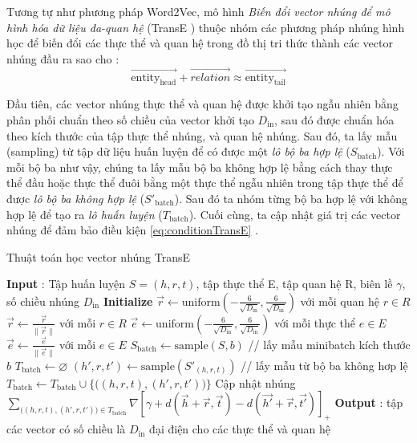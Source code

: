 Tương tự như phương pháp Word2Vec\cite{mikolov2013efficient}, mô hình \textit{Biến đổi vector nhúng để mô hình hóa dữ liệu đa-quan hệ} (TransE \cite{bordes2013translating}) thuộc nhóm các phương pháp nhúng hình học để biến đổi các thực thể và quan hệ trong đồ thị tri thức thành các vector nhúng đầu ra sao cho :
\begin{equation}
	\label{eq:conditionTransE}
	\overrightarrow{\text{entity}_{\text{head}}} + \overrightarrow{relation} \approx \overrightarrow{\text{entity}_{\text{tail}}}
\end{equation}

Đầu tiên, các vector nhúng thực thể và quan hệ được khởi tạo ngẫu nhiên bằng phân phối chuẩn theo số chiều của vector khởi tạo $D_{\text{in}}$, sau đó được chuẩn hóa theo kích thước của tập thực thể nhúng, và quan hệ nhúng.
Sau đó, ta lấy mẫu (sampling) từ tập dữ liệu huấn luyện để có được một \textit{lô bộ ba hợp lệ} ($S_{\text{batch}}$). Với mỗi bộ ba như vậy, chúng ta lấy mẫu bộ ba không hợp lệ bằng cách thay thực thể đầu hoặc thực thể đuôi bằng một thực thể ngẫu nhiên trong tập thực thể để được \textit{lô bộ ba không hợp lệ} ($S'_{\text{batch}}$). Sau đó ta nhóm từng bộ ba hợp lệ với không hợp lệ để tạo ra \textit{lô huấn luyện} ($T_{\text{batch}}$). Cuối cùng, ta cập nhật giá trị các vector nhúng để đảm bảo điều kiện  \ref{eq:conditionTransE} .

\begin{algorithm}
	\caption{Thuật toán học vector nhúng TransE \protect\cite{bordes2013translating}}\label{alg:TransE}
	\begin{algorithmic}[1]
		\Statex \textbf{Input} :
		Tập huấn luyện $S = {(h, r, t)}$, tập thực thể E, tập quan hệ R, biên lề $\gamma$, số chiều nhúng $D_{\text{in}}$	
		\Statex \textbf{Initialize}
		\State $\overrightarrow{r} \leftarrow \text{uniform}(-\frac{6}{\sqrt{D_{\text{in}}}}, \frac{6}{\sqrt{D_{\text{in}}}})$ với mỗi quan hệ $r \in R$
		\State $\overrightarrow{r} \leftarrow \frac{\overrightarrow{r}}{\|\overrightarrow{r}\|}$ với mỗi $r \in R$
		\State $\overrightarrow{e} \leftarrow \text{uniform}(-\frac{6}{\sqrt{D_{\text{in}}}}, \frac{6}{\sqrt{D_{\text{in}}}})$ với mỗi thực thể $e \in E$
		\Loop
		\State $\overrightarrow{e} \leftarrow \frac{\overrightarrow{e}}{\|\overrightarrow{e}\|}$ với mỗi $e \in E$
		\State $S_{\text{batch}} \leftarrow \text{sample}(S, b)$  // lấy mẫu minibatch kích thước $b$
		\State $T_{\text{batch}} \leftarrow \varnothing $
		\State $(h', r, t') \leftarrow \text{sample}(S'_{(h, r, t)})$ // lấy mẫu từ bộ ba không hơp lệ
		\State $T_{\text{batch}} \leftarrow T_{\text{batch}} \cup \Big\{ \Big( (h, r, t), (h', r, t') \Big) \Big\}$
		\EndFor
		\Statex Cập nhật nhúng
		\State $\sum_{\Big( (h, r, t), (h', r, t')\Big) \in T_{\text{batch}}} \nabla [\gamma + d(\overrightarrow{h} + \overrightarrow{r}, \overrightarrow{t}) - d(\overrightarrow{h'} + \overrightarrow{r}, \overrightarrow{t'})]_{+}$
		\EndLoop
		\Statex \textbf{Output} :
		tập các vector có số chiều là $D_{\text{in}}$ đại điện cho các thực thể và quan hệ
	\end{algorithmic}
\end{algorithm}

